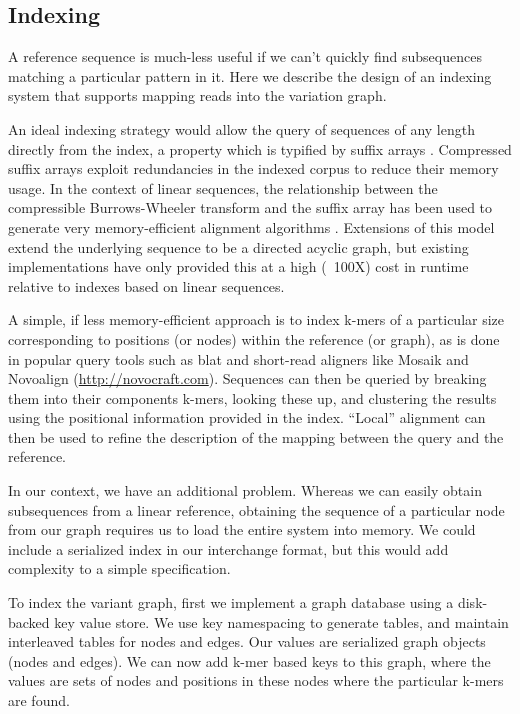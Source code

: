 \documentclass{article}
\begin{document}
\subsection{Indexing}

A reference sequence is much-less useful if we can't quickly find subsequences matching a particular pattern in it. Here we describe the design of an indexing system that supports mapping reads into the variation graph.

An ideal indexing strategy would allow the query of sequences of any length directly from the index, a property which is typified by suffix arrays \cite{puglisi2007taxonomy}. Compressed suffix arrays exploit redundancies in the indexed corpus to reduce their memory usage. In the context of linear sequences, the relationship between the compressible Burrows-Wheeler transform and the suffix array has been used to generate very memory-efficient alignment algorithms \cite{li2013aligning}. Extensions of this model extend the underlying sequence to be a directed acyclic graph, but existing implementations have only provided this at a high (~100X) cost in runtime \cite{siren2011indexing, huang2013short} relative to indexes based on linear sequences.

A simple, if less memory-efficient approach is to index k-mers of a particular size corresponding to positions (or nodes) within the reference (or graph), as is done in popular query tools such as blat \cite{kent2002blat} and short-read aligners like Mosaik \cite{lee2014mosaik} and Novoalign (\url{http://novocraft.com}).
Sequences can then be queried by breaking them into their components k-mers, looking these up, and clustering the results using the positional information provided in the index.
``Local'' alignment can then be used to refine the description of the mapping between the query and the reference.

In our context, we have an additional problem. Whereas we can easily obtain subsequences from a linear reference, obtaining the sequence of a particular node from our graph requires us to load the entire system into memory. We could include a serialized index in our interchange format, but this would add complexity to a simple specification.

To index the variant graph, first we implement a graph database using a disk-backed key value store. We use key namespacing to generate tables, and maintain interleaved tables for nodes and edges. Our values are serialized graph objects (nodes and edges). We can now add k-mer based keys to this graph, where the values are sets of nodes and positions in these nodes where the particular k-mers are found.
\end{document}
